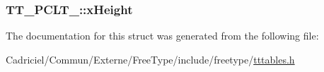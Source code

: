\hypertarget{struct_t_t___p_c_l_t___a4b2f3e6bf6508eacbff5e4eb16745872}{
\subsubsection[{x\-Height}]{ T\-T\-\_\-\-P\-C\-L\-T\-\_\-\-::x\-Height}}\label{struct_t_t___p_c_l_t___a4b2f3e6bf6508eacbff5e4eb16745872}


The documentation for this struct was generated from the following file\-:\begin{DoxyCompactItemize}
\item 
Cadriciel/\-Commun/\-Externe/\-Free\-Type/include/freetype/\hyperlink{tttables_8h}{tttables.\-h}\end{DoxyCompactItemize}
